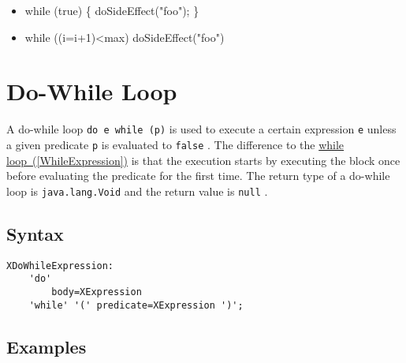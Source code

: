 \documentclass[a4paper,10pt]{scrreprt}
\newlength{\itemindentlen}
\begin{document}
\setlength{\itemindentlen}{\textwidth}
\begin{itemize}
\addtolength{\itemindentlen}{-2em}

\item \begin{minipage}[t]{\itemindentlen}

	while (true) \{
		doSideEffect("foo");
	\}
	
\end{minipage}

\item \begin{minipage}[t]{\itemindentlen}

	while ((i=i+1)<max) doSideEffect("foo")
	
\end{minipage}

\end{itemize}
\addtolength{\itemindentlen}{2em}







\section{Do-While Loop}
\label{DoWhileExpression}
A do-while loop \lstinline{do e while (p)}
 is used to execute a certain expression \lstinline{e}
 unless a given predicate \lstinline{p}
 is evaluated to \lstinline{false}
.
The difference to the 
\hyperref[WhileExpression]{while loop~(\ref*{WhileExpression})} is that the execution starts by executing the block once before evaluating the predicate for the first time.
The return type of a do-while loop is \lstinline{java.lang.Void}
 and the return value is \lstinline{null}
.

\subsection{Syntax}

\begin{lstlisting}
XDoWhileExpression:
	'do'
		body=XExpression
	'while' '(' predicate=XExpression ')';

\end{lstlisting}
 




\subsection{Examples}
\end{document}
